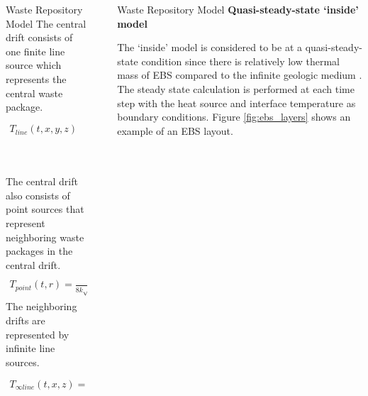 \documentclass[final]{beamer}
\newlength{\sepwid}
\newlength{\onecolwid}
\newlength{\threecolwid}
\begin{document}
\begin{frame}[t]
\begin{columns}[t,totalwidth=\threecolwid]
\begin{column}{\onecolwid}
\begin{block}{Waste Repository Model}
The central drift consists of one finite line source which represents the central 
waste package.
\begin{align*}
	T_{line}(t,x,y,z) &= \frac{1}{8 \pi k}  \int _{0}^{t} \frac{q_L(t')}{t-t'}e^{\frac{-(x^2+z^2)}{4\alpha(t-t')}} \\
	&[erf[\frac{1}{2}\frac{y+L/2}{\sqrt{\alpha(t-t')}}]-erf[\frac{1}{2}\frac{y-L/2}{\sqrt{\alpha(t-t')}}]] dt'
\end{align*}
The central drift also consists of point sources that represent neighboring 
waste packages in the central drift. 
\begin{align*}
	T_{point}(t,r) = \frac{1}{8 k \sqrt{\alpha} \pi^{3/2}} \int_{0}^{t}\frac{q(t')}{(t-t')^{3/2}}e^{\frac{-r^2}{4\alpha(t-t')}}dt'
\end{align*}
The neighboring drifts are represented by infinite line sources.  
\begin{align*}
	T_{\infty line}(t,x,z) = \frac{1}{4\pi k} \int_0^t \frac{q_L(t')}{t-t'} e^{\frac{-(x^2+z^2)}{4\alpha (t-t')}} dt'
\end{align*}

\end{block}



\end{column} %

\begin{column}{\sepwid}\end{column} %

\begin{column}{\onecolwid} %

\begin{block}{Waste Repository Model}
\textbf{Quasi-steady-state `inside' model}

The `inside' model is considered to be at a quasi-steady-state condition since there is 
relatively low thermal mass of \gls{EBS} compared to the infinite geologic medium 
\cite{sutton_investigations_2011}. 
The steady state calculation is performed at each time step with the heat source and 
interface temperature as boundary conditions. 
Figure \ref{fig:ebs_layers} shows an example of an \gls{EBS} layout.


\end{block}
\end{column}
\end{columns}
\end{frame}
\end{document}

